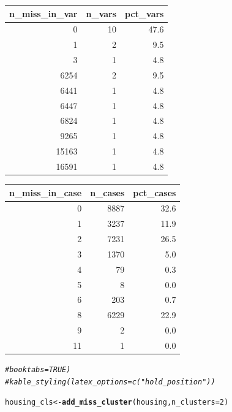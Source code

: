 \documentclass{article}\usepackage[]{graphicx}\usepackage[]{xcolor}
\makeatletter
\newcommand{\hlnum}[1]{\textcolor[rgb]{0.686,0.059,0.569}{#1}}%
\newcommand{\hlcom}[1]{\textcolor[rgb]{0.678,0.584,0.686}{\textit{#1}}}%
\newcommand{\hlstd}[1]{\textcolor[rgb]{0.345,0.345,0.345}{#1}}%
\newcommand{\hlkwb}[1]{\textcolor[rgb]{0.69,0.353,0.396}{#1}}%
\newcommand{\hlkwc}[1]{\textcolor[rgb]{0.333,0.667,0.333}{#1}}%
\newcommand{\hlkwd}[1]{\textcolor[rgb]{0.737,0.353,0.396}{\textbf{#1}}}%
\newenvironment{kframe}{%
 \def\at@end@of@kframe{}%
 \ifinner\ifhmode%
  \def\at@end@of@kframe{\end{minipage}}%
  \begin{minipage}{\columnwidth}%
 \fi\fi%
 \def\FrameCommand##1{\hskip\@totalleftmargin \hskip-\fboxsep
 \colorbox{shadecolor}{##1}\hskip-\fboxsep
     \hskip-\linewidth \hskip-\@totalleftmargin \hskip\columnwidth}%
 \MakeFramed {\advance\hsize-\width
   \@totalleftmargin\z@ \linewidth\hsize
   \@setminipage}}%
 {\par\unskip\endMakeFramed%
 \at@end@of@kframe}
\newenvironment{knitrout}{}{} %
\makeatother
\begin{document}
\begin{knitrout}
\begin{table}
\centering
\begin{tabular}[t]{r|r|r}
\hline
n\_miss\_in\_var & n\_vars & pct\_vars\\
\hline
0 & 10 & 47.6\\
\hline
1 & 2 & 9.5\\
\hline
3 & 1 & 4.8\\
\hline
6254 & 2 & 9.5\\
\hline
6441 & 1 & 4.8\\
\hline
6447 & 1 & 4.8\\
\hline
6824 & 1 & 4.8\\
\hline
9265 & 1 & 4.8\\
\hline
15163 & 1 & 4.8\\
\hline
16591 & 1 & 4.8\\
\hline
\end{tabular}
\centering
\begin{tabular}[t]{r|r|r}
\hline
n\_miss\_in\_case & n\_cases & pct\_cases\\
\hline
0 & 8887 & 32.6\\
\hline
1 & 3237 & 11.9\\
\hline
2 & 7231 & 26.5\\
\hline
3 & 1370 & 5.0\\
\hline
4 & 79 & 0.3\\
\hline
5 & 8 & 0.0\\
\hline
6 & 203 & 0.7\\
\hline
8 & 6229 & 22.9\\
\hline
9 & 2 & 0.0\\
\hline
11 & 1 & 0.0\\
\hline
\end{tabular}
\end{table}

\begin{kframe}\begin{alltt}
             \hlcom{# booktabs = TRUE)}
  \hlcom{# kable_styling(latex_options = c("hold_position"))}
\end{alltt}
\end{kframe}
\end{knitrout}
\begin{knitrout}
\color{fgcolor}\begin{kframe}
\begin{alltt}
\hlstd{housing_cls} \hlkwb{<-} \hlkwd{add_miss_cluster}\hlstd{(housing,} \hlkwc{n_clusters} \hlstd{=} \hlnum{2}\hlstd{)}
\end{alltt}
\end{kframe}
\end{knitrout}
\end{document}
